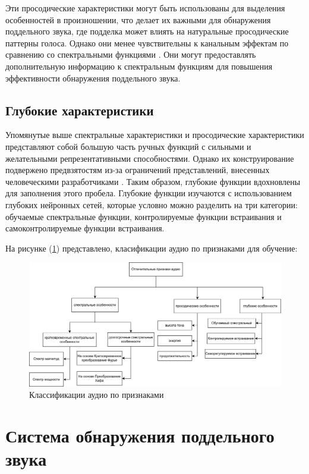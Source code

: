 Эти просодические характеристики могут быть использованы для выделения особенностей в произношении, что делает их важными для обнаружения поддельного звука, где подделка может влиять на натуральные просодические паттерны голоса. Однако они менее чувствительны к канальным эффектам по сравнению со спектральными функциями \cite{wu2015spoofing}. Они могут предоставлять дополнительную информацию к спектральным функциям для повышения эффективности обнаружения поддельного звука.

\section{Глубокие характеристики}

Упомянутые выше спектральные характеристики и просодические характеристики представляют собой большую часть ручных функций с сильными и желательными репрезентативными способностями. Однако их конструирование подвержено предвзятостям из-за ограничений представлений, внесенных человеческими разработчиками \cite{zeghidour2021leaf}. Таким образом, глубокие функции вдохновлены для заполнения этого пробела. Глубокие функции изучаются с использованием глубоких нейронных сетей, которые условно можно разделить на три категории: обучаемые спектральные функции, контролируемые функции встраивания и самоконтролируемые функции встраивания.

На рисунке (\ref{fig:audio-classification}) представлено, класификации аудио по признаками для обучение: 
\begin{figure}[H]
	\centering
	\includegraphics[width=1\linewidth]{images/classification-of-audio.png}
	\caption{Классификации аудио по признаками}
	\label{fig:audio-classification}
\end{figure}

\vspace{12pt}
{\let\clearpage\relax \chapter{Система обнаружения поддельного звука}}

